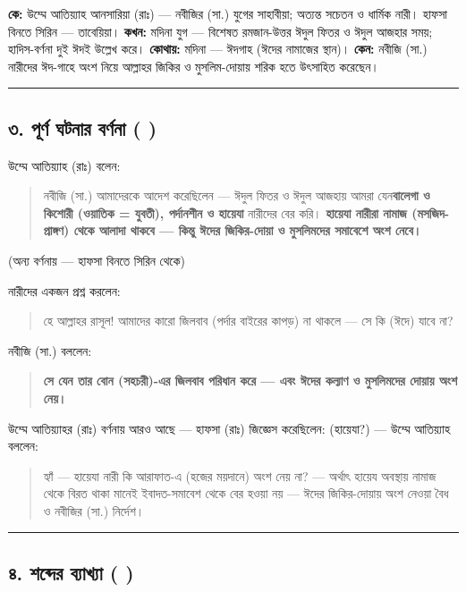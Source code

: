 \textbf{কে:} উম্মে আতিয়্যাহ আনসারিয়া (রাঃ) — নবীজির (সা.) যুগের সাহাবীয়া; অত্যন্ত সচেতন ও ধার্মিক নারী। হাফসা বিনতে সিরিন — তাবেয়িয়া।
\textbf{কখন:} মদিনা যুগ — বিশেষত রমজান-উত্তর ঈদুল ফিতর ও ঈদুল আজহার সময়; হাদিস-বর্ণনা দুই ঈদই উল্লেখ করে।
\textbf{কোথায়:} মদিনা — ঈদগাহ (ঈদের নামাজের স্থান)।
\textbf{কেন:} নবীজি (সা.) নারীদের ঈদ-গাহে অংশ নিয়ে আল্লাহর জিকির ও মুসলিম-দোয়ায় শরিক হতে উৎসাহিত করেছেন।

\medskip\hrule\medskip

\subsection*{৩. পূর্ণ ঘটনার বর্ণনা (  )}

উম্মে আতিয়্যাহ (রাঃ) বলেন:

\begin{quote}
নবীজি (সা.) আমাদেরকে আদেশ করেছিলেন — ঈদুল ফিতর ও ঈদুল আজহায় আমরা যেন\textbf{বালেগা ও কিশোরী (ওয়াতিক = যুবতী), পর্দানশীন ও হায়েযা} নারীদের বের করি। \textbf{হায়েযা নারীরা নামাজ (মসজিদ-প্রাঙ্গণ) থেকে আলাদা থাকবে — কিন্তু ঈদের জিকির-দোয়া ও মুসলিমদের সমাবেশে অংশ নেবে।}
\end{quote}

(অন্য বর্ণনায় — হাফসা বিনতে সিরিন থেকে)

নারীদের একজন প্রশ্ন করলেন:
\begin{quote}
হে আল্লাহর রাসূল! আমাদের কারো জিলবাব (পর্দার বাইরের কাপড়) না থাকলে — সে কি (ঈদে) যাবে না?
\end{quote}

নবীজি (সা.) বললেন:
\begin{quote}
\textbf{সে যেন তার বোন (সহচরী)-এর জিলবাব পরিধান করে — এবং ঈদের কল্যাণ ও মুসলিমদের দোয়ায় অংশ নেয়।}
\end{quote}

উম্মে আতিয়্যাহর (রাঃ) বর্ণনায় আরও আছে — হাফসা (রাঃ) জিজ্ঞেস করেছিলেন: (হায়েযা?) — উম্মে আতিয়্যাহ বললেন:
\begin{quote}
হ্যাঁ — হায়েযা নারী কি আরাফাত-এ (হজের ময়দানে) অংশ নেয় না? — অর্থাৎ হায়েয অবস্থায় নামাজ থেকে বিরত থাকা মানেই ইবাদত-সমাবেশ থেকে বের হওয়া নয় — ঈদের জিকির-দোয়ায় অংশ নেওয়া বৈধ ও নবীজির (সা.) নির্দেশ।
\end{quote}

\medskip\hrule\medskip

\subsection*{৪. শব্দের ব্যাখ্যা ( )}

